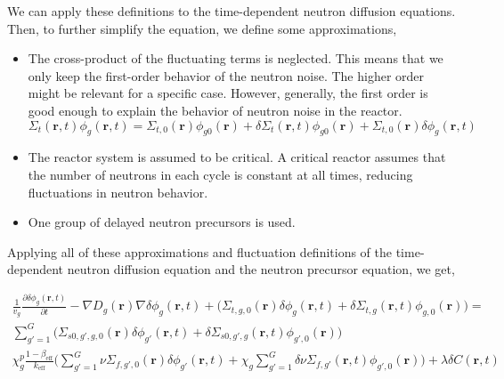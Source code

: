 We can apply these definitions to the time-dependent neutron diffusion equations. Then, to further simplify the equation, we define some approximations,
\begin{itemize}
        \item The cross-product of the fluctuating terms is neglected. This means that we only keep the first-order behavior of the neutron noise. The higher order might be relevant for a specific case. However, generally, the first order is good enough to explain the behavior of neutron noise in the reactor.
        \begin{equation}
                \Sigma_t (\textbf{r}, t) \phi_g (\textbf{r}, t) = \Sigma_{t,0} (\textbf{r}) \phi_{g0} (\textbf{r}) + \delta \Sigma_t (\textbf{r}, t) \phi_{g0} (\textbf{r}) + \Sigma_{t,0} (\textbf{r}) \delta \phi_g (\textbf{r}, t)
        \end{equation}

        \item The reactor system is assumed to be critical. A critical reactor assumes that the number of neutrons in each cycle is constant at all times, reducing fluctuations in neutron behavior. 
	\item One group of delayed neutron precursors is used. 
\end{itemize}

Applying all of these approximations and fluctuation definitions of the time-dependent neutron diffusion equation and the neutron precursor equation, we get,

\begin{equation}
        \begin{aligned}
                \frac{1}{v_g} \frac{\partial \delta \phi_g (\textbf{r}, t)}{\partial t} - \nabla D_g(\textbf{r}) \nabla \delta \phi_g(\textbf{r}, t) + \biggl(\Sigma_{t,g,0}(\textbf{r}) \delta \phi_g(\textbf{r}, t) + \delta \Sigma_{t,g}(\textbf{r}, t) \phi_{g,0}(\textbf{r}) \biggr) = \\
                \sum_{g' = 1}^{G} \biggl(\Sigma_{s0,g',g,0}(\textbf{r}) \delta \phi_{g'}(\textbf{r}, t) + \delta \Sigma_{s0,g',g}(\textbf{r}, t) \phi_{g',0}(\textbf{r}) \biggr)\\
                \chi^p_g \frac{1-\beta_{\text{eff}}}{k_{\text{eff}}} \biggl(\sum_{g' = 1}^{G} \nu \Sigma_{f,g',0}(\textbf{r}) \delta \phi_{g'}(\textbf{r}, t) + \chi_g \sum_{g' = 1}^{G} \delta \nu \Sigma_{f,g'}(\textbf{r}, t) \phi_{g',0}(\textbf{r}) \biggr) + \lambda \delta C(\textbf{r}, t)
        \end{aligned}
        \label{eq:time_1}
\end{equation}

